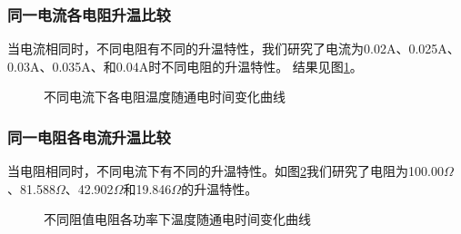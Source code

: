 \documentclass[10pt,a4paper,twoside,UTF8]{ctexart}
\begin{document}
\subsubsection{同一电流各电阻升温比较}
当电流相同时，不同电阻有不同的升温特性，我们研究了电流为0.02A、0.025A、0.03A、0.035A、和0.04A时不同电阻的升温特性。
结果见图\ref{fig: real_var_I}。
\begin{figure}[H]
	\centering

	\caption{不同电流下各电阻温度随通电时间变化曲线}
	\label{fig: real_var_I}
\end{figure}

\subsubsection{同一电阻各电流升温比较}
当电阻相同时，不同电流下有不同的升温特性。如图\ref{fig:real_var_R}我们研究了电阻为100.00$\Omega$、81.588$\Omega$、42.902$\Omega$和19.846$\Omega$的升温特性。
\begin{figure}[H]
	\centering

	\caption{不同阻值电阻各功率下温度随通电时间变化曲线}
	\label{fig:real_var_R}
\end{figure}
\end{document}
